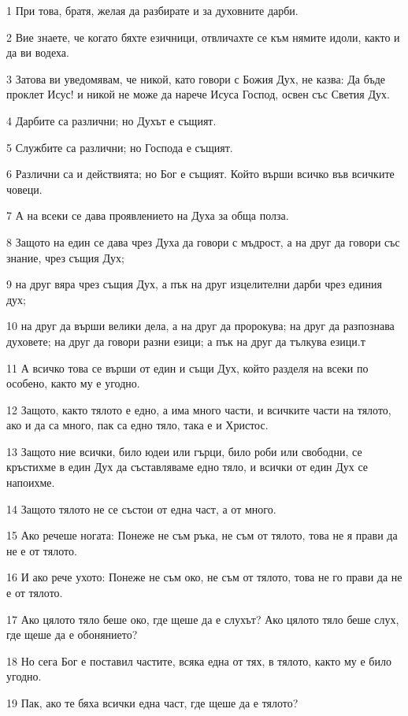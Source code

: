 \par 1 При това, братя, желая да разбирате и за духовните дарби.
\par 2 Вие знаете, че когато бяхте езичници, отвличахте се към нямите идоли, както и да ви водеха.
\par 3 Затова ви уведомявам, че никой, като говори с Божия Дух, не казва: Да бъде проклет Исус! и никой не може да нарече Исуса Господ, освен със Светия Дух.
\par 4 Дарбите са различни; но Духът е същият.
\par 5 Службите са различни; но Господа е същият.
\par 6 Различни са и действията; но Бог е същият. Който върши всичко във всичките човеци.
\par 7 А на всеки се дава проявлението на Духа за обща полза.
\par 8 Защото на един се дава чрез Духа да говори с мъдрост, а на друг да говори със знание, чрез същия Дух;
\par 9 на друг вяра чрез същия Дух, а пък на друг изцелителни дарби чрез единия дух;
\par 10 на друг да върши велики дела, а на друг да пророкува; на друг да разпознава духовете; на друг да говори разни езици; а пък на друг да тълкува езици.т
\par 11 А всичко това се върши от един и същи Дух, който разделя на всеки по особено, както му е угодно.
\par 12 Защото, както тялото е едно, а има много части, и всичките части на тялото, ако и да са много, пак са едно тяло, така е и Христос.
\par 13 Защото ние всички, било юдеи или гърци, било роби или свободни, се кръстихме в един Дух да съставляваме едно тяло, и всички от един Дух се напоихме.
\par 14 Защото тялото не се състои от една част, а от много.
\par 15 Ако речеше ногата: Понеже не съм ръка, не съм от тялото, това не я прави да не е от тялото.
\par 16 И ако рече ухото: Понеже не съм око, не съм от тялото, това не го прави да не е от тялото.
\par 17 Ако цялото тяло беше око, где щеше да е слухът? Ако цялото тяло беше слух, где щеше да е обонянието?
\par 18 Но сега Бог е поставил частите, всяка една от тях, в тялото, както му е било угодно.
\par 19 Пак, ако те бяха всички една част, где щеше да е тялото?
